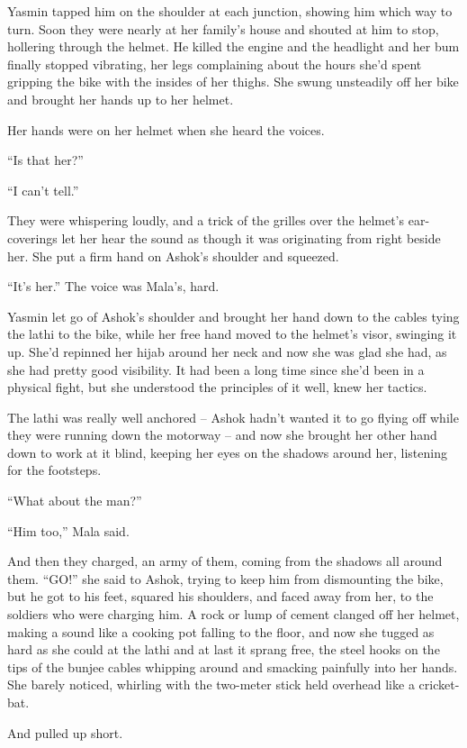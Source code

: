 Yasmin tapped him on the shoulder at each junction, showing him
which way to turn. Soon they were nearly at her family's house and
shouted at him to stop, hollering through the helmet. He killed the
engine and the headlight and her bum finally stopped vibrating, her
legs complaining about the hours she'd spent gripping the bike with
the insides of her thighs. She swung unsteadily off her bike and
brought her hands up to her helmet.

Her hands were on her helmet when she heard the voices.

``Is that her?''

``I can't tell.''

They were whispering loudly, and a trick of the grilles over the
helmet's ear-coverings let her hear the sound as though it was
originating from right beside her. She put a firm hand on Ashok's
shoulder and squeezed.

``It's her.'' The voice was Mala's, hard.

Yasmin let go of Ashok's shoulder and brought her hand down to the
cables tying the lathi to the bike, while her free hand moved to
the helmet's visor, swinging it up. She'd repinned her hijab around
her neck and now she was glad she had, as she had pretty good
visibility. It had been a long time since she'd been in a physical
fight, but she understood the principles of it well, knew her
tactics.

The lathi was really well anchored -- Ashok hadn't wanted it to go
flying off while they were running down the motorway -- and now she
brought her other hand down to work at it blind, keeping her eyes
on the shadows around her, listening for the footsteps.

``What about the man?''

``Him too,'' Mala said.

And then they charged, an army of them, coming from the shadows all
around them. ``GO!'' she said to Ashok, trying to keep him from
dismounting the bike, but he got to his feet, squared his
shoulders, and faced away from her, to the soldiers who were
charging him. A rock or lump of cement clanged off her helmet,
making a sound like a cooking pot falling to the floor, and now she
tugged as hard as she could at the lathi and at last it sprang
free, the steel hooks on the tips of the bunjee cables whipping
around and smacking painfully into her hands. She barely noticed,
whirling with the two-meter stick held overhead like a
cricket-bat.

And pulled up short.

